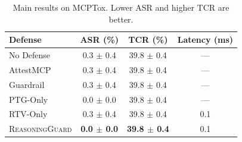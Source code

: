 \begin{table}[t]
\centering
\small
\begin{tabular}{lccc}
\toprule
Defense & ASR (\%) & TCR (\%) & Latency (ms) \\
\midrule
No Defense & 0.3 $\pm$ 0.4 & 39.8 $\pm$ 0.4 & --- \\
AttestMCP & 0.3 $\pm$ 0.4 & 39.8 $\pm$ 0.4 & --- \\
Guardrail & 0.3 $\pm$ 0.4 & 39.8 $\pm$ 0.4 & --- \\
PTG-Only & 0.0 $\pm$ 0.0 & 39.8 $\pm$ 0.4 & --- \\
RTV-Only & 0.3 $\pm$ 0.4 & 39.8 $\pm$ 0.4 & 0.1 \\
\textsc{ReasoningGuard} & \textbf{0.0 $\pm$ 0.0} & \textbf{39.8 $\pm$ 0.4} & 0.1 \\
\bottomrule
\end{tabular}
\caption{Main results on MCPTox. Lower ASR and higher TCR are better.}
\label{tab:main}
\end{table}

